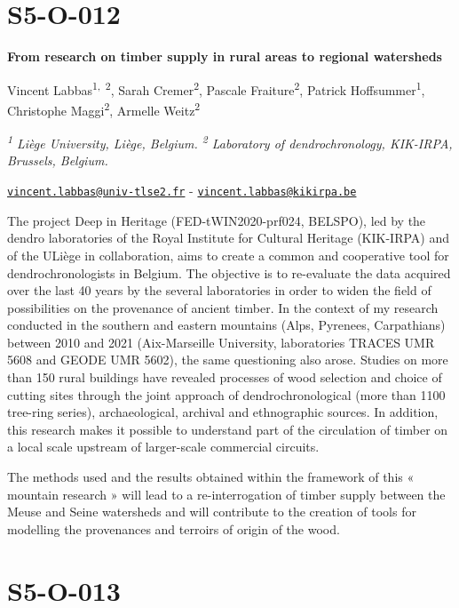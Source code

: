 \documentclass[
]{book}
\begin{document}
\hypertarget{s5-o-012}{%
\section*{S5-O-012}\label{s5-o-012}}

\textbf{From research on timber supply in rural areas to regional watersheds}

Vincent Labbas\textsuperscript{1,~2}, Sarah Cremer\textsuperscript{2}, Pascale Fraiture\textsuperscript{2}, Patrick Hoffsummer\textsuperscript{1}, Christophe Maggi\textsuperscript{2}, Armelle Weitz\textsuperscript{2}

\emph{\textsuperscript{1} Liège University, Liège, Belgium. \textsuperscript{2} Laboratory of dendrochronology, KIK-IRPA, Brussels, Belgium.}

\href{mailto:vincent.labbas@univ-tlse2.fr}{\nolinkurl{vincent.labbas@univ-tlse2.fr}} - \href{mailto:vincent.labbas@kikirpa.be}{\nolinkurl{vincent.labbas@kikirpa.be}}

The project Deep in Heritage (FED-tWIN2020-prf024, BELSPO), led by the dendro laboratories of the Royal Institute for Cultural Heritage (KIK-IRPA) and of the ULiège in collaboration, aims to create a common and cooperative tool for dendrochronologists in Belgium. The objective is to re-evaluate the data acquired over the last 40 years by the several laboratories in order to widen the field of possibilities on the provenance of ancient timber. In the context of my research conducted in the southern and eastern mountains (Alps, Pyrenees, Carpathians) between 2010 and 2021 (Aix-Marseille University, laboratories TRACES UMR 5608 and GEODE UMR 5602), the same questioning also arose. Studies on more than 150 rural buildings have revealed processes of wood selection and choice of cutting sites through the joint approach of dendrochronological (more than 1100 tree-ring series), archaeological, archival and ethnographic sources. In addition, this research makes it possible to understand part of the circulation of timber on a local scale upstream of larger-scale commercial circuits.

The methods used and the results obtained within the framework of this « mountain research » will lead to a re-interrogation of timber supply between the Meuse and Seine watersheds and will contribute to the creation of tools for modelling the provenances and terroirs of origin of the wood.

\hypertarget{s5-o-013}{%
\section*{S5-O-013}\label{s5-o-013}}
\end{document}
